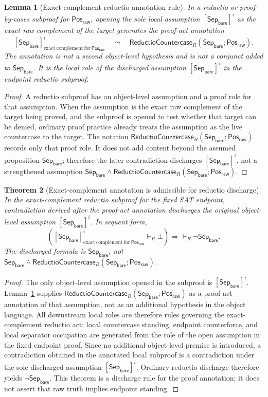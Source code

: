 \documentclass[11pt]{article}
\newtheorem{theorem}{Theorem}[section]
\newtheorem{lemma}[theorem]{Lemma}
\theoremstyle{definition}
\theoremstyle{remark}
\newcommand{\PosRaw}{\mathsf{Pos}_{\mathsf{raw}}}
\newcommand{\SepBare}{\mathsf{Sep}_{\mathsf{bare}}}
\newcommand{\ReductioCountercase}{\mathsf{ReductioCountercase}}
\begin{document}
\begin{lemma}[Exact-complement reductio annotation rule]
\label{lem:exact-complement-reductio-annotation-rule}
In a reductio or proof-by-cases subproof for \(\PosRaw\), opening the sole local assumption \([\SepBare]^i\) as the exact raw complement of the target generates the proof-act annotation
\[
  [\SepBare]^i_{\mathrm{exact\ complement\ for}\ \PosRaw}
  \quad\leadsto\quad
  \ReductioCountercase_R(\SepBare;\PosRaw).
\]
The annotation is not a second object-level hypothesis and is not a conjunct added to \(\SepBare\). It is the local role of the discharged assumption \([\SepBare]^i\) in the endpoint reductio subproof.
\end{lemma}

\begin{proof}
A reductio subproof has an object-level assumption and a proof role for that assumption. When the assumption is the exact raw complement of the target being proved, and the subproof is opened to test whether that target can be denied, ordinary proof practice already treats the assumption as the live countercase to the target. The notation \(\ReductioCountercase_R(\SepBare;\PosRaw)\) records only that proof role. It does not add content beyond the assumed proposition \(\SepBare\); therefore the later contradiction discharges \([\SepBare]^i\), not a strengthened assumption \(\SepBare\wedge\ReductioCountercase_R(\SepBare;\PosRaw)\).
\end{proof}


\begin{theorem}[Exact-complement annotation is admissible for reductio discharge]
\label{thm:exact-complement-annotation-discharge}
In the exact-complement reductio subproof for the fixed SAT endpoint, contradiction derived after the proof-act annotation discharges the original object-level assumption \([\SepBare]^i\). In sequent form,
\[
  \left([\SepBare]^i_{\mathrm{exact\ complement\ for}\ \PosRaw}\vdash_R \bot\right)
  \Rightarrow \vdash_R \neg\SepBare.
\]
The discharged formula is \(\SepBare\), not \(\SepBare\wedge\ReductioCountercase_R(\SepBare;\PosRaw)\).
\end{theorem}

\begin{proof}
The only object-level assumption opened in the subproof is \([\SepBare]^i\). Lemma~\ref{lem:exact-complement-reductio-annotation-rule} supplies \(\ReductioCountercase_R(\SepBare;\PosRaw)\) as a proof-act annotation of that assumption, not as an additional hypothesis in the object language. All downstream local roles are therefore rules governing the exact-complement reductio act: local countercase standing, endpoint counterforce, and local separator occupation are generated from the role of the open assumption in the fixed endpoint proof. Since no additional object-level premise is introduced, a contradiction obtained in the annotated local subproof is a contradiction under the sole discharged assumption \([\SepBare]^i\). Ordinary reductio discharge therefore yields \(\neg\SepBare\). This theorem is a discharge rule for the proof annotation; it does not assert that raw truth implies endpoint standing.
\end{proof}
\end{document}
